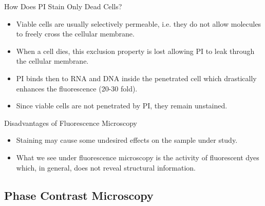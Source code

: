 \begin{frame}{How Does PI Stain Only Dead Cells?}
	\begin{itemize}
		\item<1-> Viable cells are usually selectively permeable, i.e. they do not allow molecules to freely cross the cellular membrane.
		\item<2-> When a cell dies, this exclusion property is lost allowing PI to leak through the cellular membrane.
		\item<3-> PI binds then to RNA and DNA inside the penetrated cell which drastically enhances the fluorescence (20-30 fold).
		\item<4-> Since viable cells are not penetrated by PI, they remain unstained.
	\end{itemize}
\end{frame}
\begin{frame}{Disadvantages of Fluorescence Microscopy}
	\begin{itemize}
		\item<1-> Staining may cause some undesired effects on the sample under study.
		\item<2-> What we see under fluorescence microscopy is the activity of fluorescent dyes which, in general, does not reveal structural information.
	\end{itemize}
\end{frame}


\subsection{Phase Contrast Microscopy}%
\label{sub:phase_contrast_microscopy}



